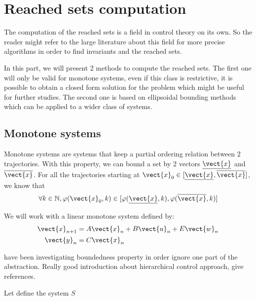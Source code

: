 \newcommand{\xinf}{\underline{\vect{x}}}%
\newcommand{\xsup}{\overline{\vect{x}}}%
\newcommand{\xinit}{\vect{x}_0}%
\newcommand{\traj}{\varphi}%
\newcommand{\xn}{\vect{x}_n}%
\newcommand{\un}{\vect{u}_n}%
\newcommand{\wn}{\vect{w}_n}%
\newcommand{\yn}{\vect{y}_n}%
\newcommand{\xnn}{\vect{x}_{n+1}}%
%
\section{Reached sets computation}
%
The computation of the reached sets is a field in control theory on its own.
So the reader might refer to the large literature about this field for more precise algorithms in order to find invariants and the reached sets.

In this part, we will present 2 methods to compute the reached sets.
The first one will only be valid for monotone systems, even if this class is restrictive, it is possible to obtain a closed form solution for the problem which might be useful for further studies.
The second one is based on ellipsoidal bounding methods which can be applied to a wider class of systems. 


\subsection{Monotone systems}
Monotone systems are systems that keep a partial ordering relation between 2 trajectories. With this property, we can bound a set by 2 vectors $\xinf$ and $\xsup$.
For all the trajectories starting at $\xinit \in [\xinf,\xsup]$, we know that
\begin{equation}
\forall k \in \mathbb{N}, \traj(\xinit,k) \in [\traj(\xinf,k),\traj(\xsup,k)]
\end{equation}

We will work with a linear monotone system defined by:
\begin{equation} \label{sys:monotone_lti}
\begin{split}
\xnn &= A \xn + B \un + E \wn \\
\yn &= C \xn
\end{split}
\end{equation}

\cite{liu2014abstraction} have been investigating boundedness property in order ignore one part of the abstraction.
Really good introduction about hierarchical control approach, give references.

Let define the system $S$

